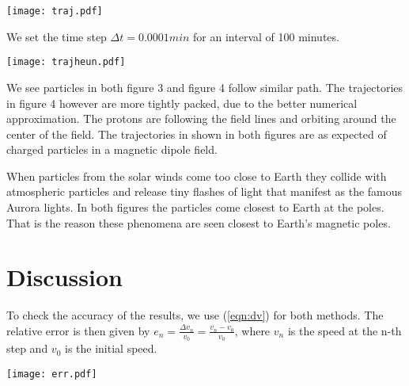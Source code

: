 \documentclass[final,5p,times,twocolumn,authoryear]{elsarticle}
\begin{document}
\begin{center} \label{fig: trajeuler}
\texttt{[image: traj.pdf]}
\end{center}

We set the time step $\Delta t = 0.0001 \si{min}$ for an interval of 100 minutes.

\begin{center} \label{fig: trajheun}
\texttt{[image: trajheun.pdf]}
\end{center}

 We see particles in both figure 3 and figure 4 follow similar path. The trajectories in figure 4 however are more tightly packed, due to the better numerical approximation. The protons are following the field lines and orbiting around the center of the field. The trajectories in shown in both figures are as expected of charged particles in a magnetic dipole field.
 
 When particles from the solar winds come too close to Earth they collide with atmospheric particles and release tiny flashes of light that manifest as the famous Aurora lights. In both figures the particles come closest to Earth at the poles. That is the reason these phenomena are seen closest to Earth's magnetic poles.

\section{Discussion}
\label{discussion}
To check the accuracy of the results, we use (\ref{eqn:dv}) for both methods. The relative error is then given by $e_n = \frac{\Delta v_n}{v_0} =\frac{v_n - v_0}{v_0}$, where $v_n$ is the speed at the n-th step and $v_0$ is the initial speed.
\begin{center} \label{fig: err}
\texttt{[image: err.pdf]}
\end{center}
\end{document}
